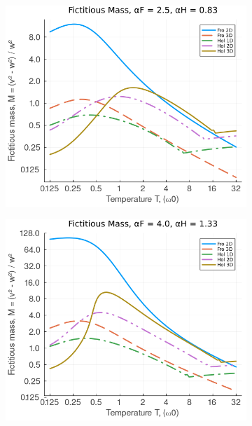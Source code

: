 \begin{figure}[!tbp]
  \begin{subfigure}[b]{0.49\textwidth}
    \includegraphics[width=\textwidth]{figures/mass_temp_25_083.png}
  \end{subfigure}
  \hfill
  \begin{subfigure}[b]{0.49\textwidth}
    \includegraphics[width=\textwidth]{figures/mass_temp_4_133.png}
  \end{subfigure}
  \begin{subfigure}[b]{0.49\textwidth}

\end{subfigure}
\end{figure}
